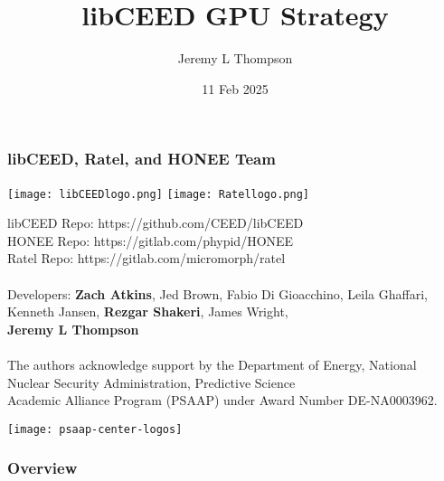 \documentclass{beamer}
\title[libCEED]{libCEED GPU Strategy
} %
\author{Jeremy L Thompson} %
\institute[CU Boulder] %
{University of Colorado Boulder \\ %
\medskip
\textit{jeremy@jeremylt.org} %
}
\date{11 Feb 2025} %
\begin{document}
\begin{frame}
\titlepage %
\end{frame}


\begin{frame}
\frametitle{libCEED, Ratel, and HONEE Team}

\begin{center}
\texttt{[image: libCEEDlogo.png]}
\texttt{[image: Ratellogo.png]}
\end{center}

{\flushleft

libCEED Repo: https://github.com/CEED/libCEED\\
HONEE Repo: https://gitlab.com/phypid/HONEE\\
Ratel Repo: https://gitlab.com/micromorph/ratel\\

~\\
Developers: \textbf{Zach Atkins}, Jed Brown, Fabio Di Gioacchino, Leila Ghaffari,\\
\hspace{19mm} Kenneth Jansen, \textbf{Rezgar Shakeri}, James Wright,\\
\hspace{19mm} \textbf{Jeremy L Thompson}\\

~\\

{\tiny The authors acknowledge support by the Department of Energy, National Nuclear Security Administration, Predictive Science\\Academic Alliance Program (PSAAP) under Award Number DE-NA0003962.}

}

\begin{center}
\texttt{[image: psaap-center-logos]}
\end{center}

\end{frame}


\begin{frame}
\frametitle{Overview} %
\tableofcontents %
\end{frame}
\end{document}
